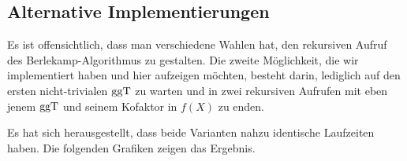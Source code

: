 \subsection{Alternative Implementierungen}

Es ist offensichtlich, dass man verschiedene Wahlen hat, den rekursiven Aufruf
des Berlekamp-Algorithmus zu gestalten. Die zweite Möglichkeit, die wir
implementiert haben und hier aufzeigen möchten, besteht darin, lediglich auf
den ersten nicht-trivialen $\operatorname{ggT}$ zu warten und in zwei rekursiven Aufrufen mit
eben jenem $\operatorname{ggT}$ und seinem Kofaktor in $f(X)$ zu enden.



Es hat sich herausgestellt, dass beide Varianten nahzu identische Laufzeiten
haben. Die folgenden Grafiken zeigen das Ergebnis.

